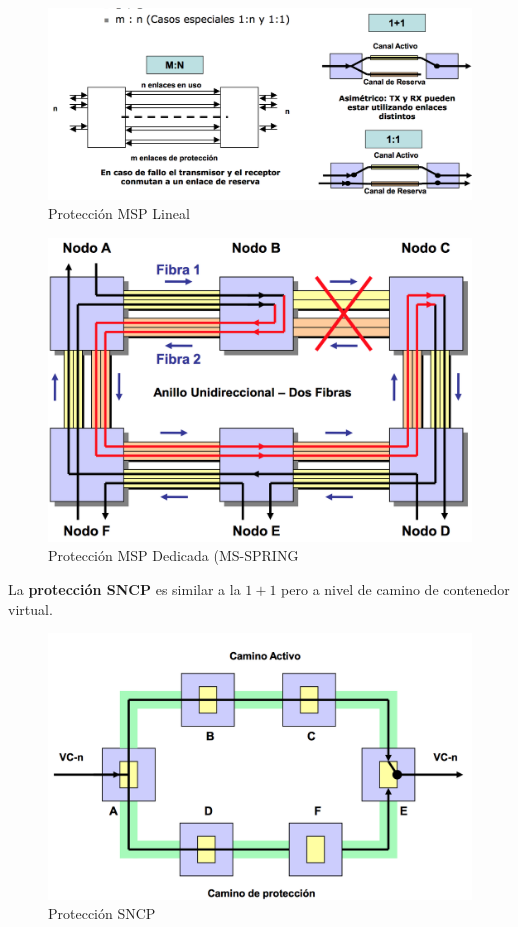 \documentclass[10pt,portrait, twocolumn]{article}
\begin{document}
	\begin{figure}[!ht]
 		\centering
  		 \includegraphics[scale = 0.4]{images/MSP}
		\caption{Protección MSP Lineal}
	\end{figure}
	
	\begin{figure}[!ht]
 		\centering
  		 \includegraphics[scale = 0.4]{images/MS}
		\caption{Protección MSP Dedicada (MS-SPRING}
	\end{figure}
	
La \textbf{protección SNCP} es similar a la $1+1$ pero a nivel de camino de contenedor virtual.

	\begin{figure}[!ht]
 		\centering
  		 \includegraphics[scale = 0.4]{images/SNCP}
		\caption{Protección SNCP}
	\end{figure}
	
\end{document}
